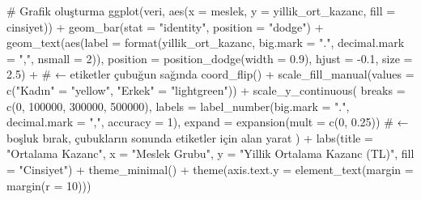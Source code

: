 \documentclass[
  11pt,
  a4paper,
  DIV=11,
  numbers=noendperiod]{scrartcl}
\newenvironment{Shaded}{\begin{snugshade}}{\end{snugshade}}
\newcommand{\AttributeTok}[1]{\textcolor[rgb]{0.40,0.45,0.13}{#1}}
\newcommand{\CommentTok}[1]{\textcolor[rgb]{0.37,0.37,0.37}{#1}}
\newcommand{\DecValTok}[1]{\textcolor[rgb]{0.68,0.00,0.00}{#1}}
\newcommand{\FloatTok}[1]{\textcolor[rgb]{0.68,0.00,0.00}{#1}}
\newcommand{\FunctionTok}[1]{\textcolor[rgb]{0.28,0.35,0.67}{#1}}
\newcommand{\NormalTok}[1]{\textcolor[rgb]{0.00,0.23,0.31}{#1}}
\newcommand{\OtherTok}[1]{\textcolor[rgb]{0.00,0.23,0.31}{#1}}
\newcommand{\SpecialCharTok}[1]{\textcolor[rgb]{0.37,0.37,0.37}{#1}}
\newcommand{\StringTok}[1]{\textcolor[rgb]{0.13,0.47,0.30}{#1}}
\begin{document}
\begin{Shaded}
\begin{Highlighting}[]
\CommentTok{\# Grafik oluşturma}
\FunctionTok{ggplot}\NormalTok{(veri, }\FunctionTok{aes}\NormalTok{(}\AttributeTok{x =}\NormalTok{ meslek, }\AttributeTok{y =}\NormalTok{ yillik\_ort\_kazanc, }\AttributeTok{fill =}\NormalTok{ cinsiyet)) }\SpecialCharTok{+}
  \FunctionTok{geom\_bar}\NormalTok{(}\AttributeTok{stat =} \StringTok{"identity"}\NormalTok{, }\AttributeTok{position =} \StringTok{"dodge"}\NormalTok{) }\SpecialCharTok{+}
  \FunctionTok{geom\_text}\NormalTok{(}\FunctionTok{aes}\NormalTok{(}\AttributeTok{label =} \FunctionTok{format}\NormalTok{(yillik\_ort\_kazanc, }\AttributeTok{big.mark =} \StringTok{"."}\NormalTok{, }\AttributeTok{decimal.mark =} \StringTok{","}\NormalTok{, }\AttributeTok{nsmall =} \DecValTok{2}\NormalTok{)),}
            \AttributeTok{position =} \FunctionTok{position\_dodge}\NormalTok{(}\AttributeTok{width =} \FloatTok{0.9}\NormalTok{), }
            \AttributeTok{hjust =} \SpecialCharTok{{-}}\FloatTok{0.1}\NormalTok{, }\AttributeTok{size =} \FloatTok{2.5}\NormalTok{) }\SpecialCharTok{+}  \CommentTok{\# ← etiketler çubuğun sağında}
  \FunctionTok{coord\_flip}\NormalTok{() }\SpecialCharTok{+}
  \FunctionTok{scale\_fill\_manual}\NormalTok{(}\AttributeTok{values =} \FunctionTok{c}\NormalTok{(}\StringTok{"Kadın"} \OtherTok{=} \StringTok{"yellow"}\NormalTok{, }\StringTok{"Erkek"} \OtherTok{=} \StringTok{"lightgreen"}\NormalTok{)) }\SpecialCharTok{+}
  \FunctionTok{scale\_y\_continuous}\NormalTok{(}
    \AttributeTok{breaks =} \FunctionTok{c}\NormalTok{(}\DecValTok{0}\NormalTok{, }\DecValTok{100000}\NormalTok{, }\DecValTok{300000}\NormalTok{, }\DecValTok{500000}\NormalTok{),}
    \AttributeTok{labels =} \FunctionTok{label\_number}\NormalTok{(}\AttributeTok{big.mark =} \StringTok{"."}\NormalTok{, }\AttributeTok{decimal.mark =} \StringTok{","}\NormalTok{, }\AttributeTok{accuracy =} \DecValTok{1}\NormalTok{),}
    \AttributeTok{expand =} \FunctionTok{expansion}\NormalTok{(}\AttributeTok{mult =} \FunctionTok{c}\NormalTok{(}\DecValTok{0}\NormalTok{, }\FloatTok{0.25}\NormalTok{))  }\CommentTok{\# ← boşluk bırak, çubukların sonunda etiketler için alan yarat}
\NormalTok{  ) }\SpecialCharTok{+}
  \FunctionTok{labs}\NormalTok{(}\AttributeTok{title =} \StringTok{"Ortalama Kazanc"}\NormalTok{,}
       \AttributeTok{x =} \StringTok{"Meslek Grubu"}\NormalTok{, }\AttributeTok{y =} \StringTok{"Yillik Ortalama Kazanc (TL)"}\NormalTok{, }\AttributeTok{fill =} \StringTok{"Cinsiyet"}\NormalTok{) }\SpecialCharTok{+}
  \FunctionTok{theme\_minimal}\NormalTok{() }\SpecialCharTok{+}
  \FunctionTok{theme}\NormalTok{(}\AttributeTok{axis.text.y =} \FunctionTok{element\_text}\NormalTok{(}\AttributeTok{margin =} \FunctionTok{margin}\NormalTok{(}\AttributeTok{r =} \DecValTok{10}\NormalTok{)))}
\end{Highlighting}
\end{Shaded}
\end{document}
